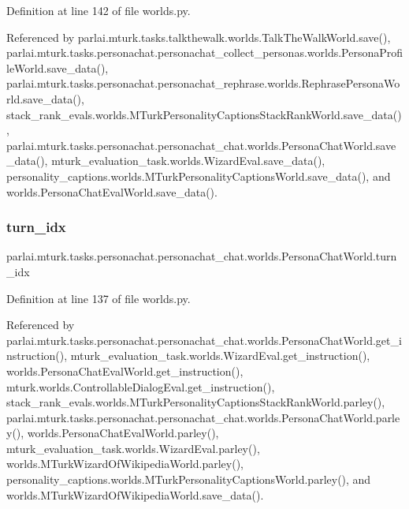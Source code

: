 Definition at line 142 of file worlds.\+py.



Referenced by parlai.\+mturk.\+tasks.\+talkthewalk.\+worlds.\+Talk\+The\+Walk\+World.\+save(), parlai.\+mturk.\+tasks.\+personachat.\+personachat\+\_\+collect\+\_\+personas.\+worlds.\+Persona\+Profile\+World.\+save\+\_\+data(), parlai.\+mturk.\+tasks.\+personachat.\+personachat\+\_\+rephrase.\+worlds.\+Rephrase\+Persona\+World.\+save\+\_\+data(), stack\+\_\+rank\+\_\+evals.\+worlds.\+M\+Turk\+Personality\+Captions\+Stack\+Rank\+World.\+save\+\_\+data(), parlai.\+mturk.\+tasks.\+personachat.\+personachat\+\_\+chat.\+worlds.\+Persona\+Chat\+World.\+save\+\_\+data(), mturk\+\_\+evaluation\+\_\+task.\+worlds.\+Wizard\+Eval.\+save\+\_\+data(), personality\+\_\+captions.\+worlds.\+M\+Turk\+Personality\+Captions\+World.\+save\+\_\+data(), and worlds.\+Persona\+Chat\+Eval\+World.\+save\+\_\+data().

\mbox{\label{classparlai_1_1mturk_1_1tasks_1_1personachat_1_1personachat__chat_1_1worlds_1_1PersonaChatWorld_a51467e3bd1a647ebccb408b416c14392}} 
\subsubsection{\texorpdfstring{turn\+\_\+idx}{turn\_idx}}
{\footnotesize\ttfamily parlai.\+mturk.\+tasks.\+personachat.\+personachat\+\_\+chat.\+worlds.\+Persona\+Chat\+World.\+turn\+\_\+idx}



Definition at line 137 of file worlds.\+py.



Referenced by parlai.\+mturk.\+tasks.\+personachat.\+personachat\+\_\+chat.\+worlds.\+Persona\+Chat\+World.\+get\+\_\+instruction(), mturk\+\_\+evaluation\+\_\+task.\+worlds.\+Wizard\+Eval.\+get\+\_\+instruction(), worlds.\+Persona\+Chat\+Eval\+World.\+get\+\_\+instruction(), mturk.\+worlds.\+Controllable\+Dialog\+Eval.\+get\+\_\+instruction(), stack\+\_\+rank\+\_\+evals.\+worlds.\+M\+Turk\+Personality\+Captions\+Stack\+Rank\+World.\+parley(), parlai.\+mturk.\+tasks.\+personachat.\+personachat\+\_\+chat.\+worlds.\+Persona\+Chat\+World.\+parley(), worlds.\+Persona\+Chat\+Eval\+World.\+parley(), mturk\+\_\+evaluation\+\_\+task.\+worlds.\+Wizard\+Eval.\+parley(), worlds.\+M\+Turk\+Wizard\+Of\+Wikipedia\+World.\+parley(), personality\+\_\+captions.\+worlds.\+M\+Turk\+Personality\+Captions\+World.\+parley(), and worlds.\+M\+Turk\+Wizard\+Of\+Wikipedia\+World.\+save\+\_\+data().

